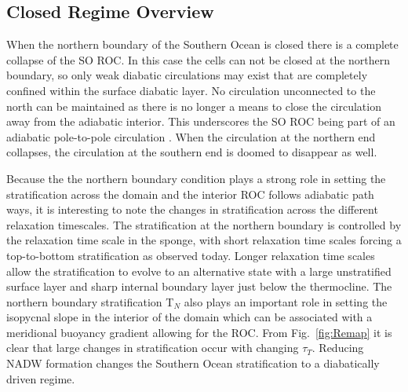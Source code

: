 \subsection{Closed Regime Overview}
When the northern boundary of the Southern Ocean is closed there is a complete collapse of the SO ROC. In this case the cells can not be closed at the northern boundary, so only weak diabatic circulations may exist that are completely confined within the surface diabatic layer. No circulation unconnected to the north can be maintained as there is no longer a means to close the circulation away from the adiabatic interior. This underscores the SO ROC being part of an adiabatic pole-to-pole circulation \citep{Wolfe2011}. When the circulation at the northern end collapses, the circulation at the southern end is doomed to disappear as well. 

Because the the northern boundary condition plays a strong role in setting the stratification across the domain and the interior ROC follows adiabatic path ways, it is interesting to note the changes in stratification across the different relaxation timescales. The stratification at the northern boundary is controlled by the relaxation time scale in the sponge, with short relaxation time scales forcing a top-to-bottom stratification as observed today. Longer relaxation time scales allow the stratification to evolve to an alternative state with a large unstratified surface layer and sharp internal boundary layer just below the thermocline. The northern boundary stratification T$_N$ also plays an important role in setting the isopycnal slope in the interior of the domain which can be associated with a meridional buoyancy gradient allowing for the ROC. From Fig.~\ref{fig:Remap} it is clear that large changes in stratification occur with changing $\tau_T$. Reducing NADW formation changes the Southern Ocean stratification \cite{Nikurashin2012a} to a diabatically driven regime. 
